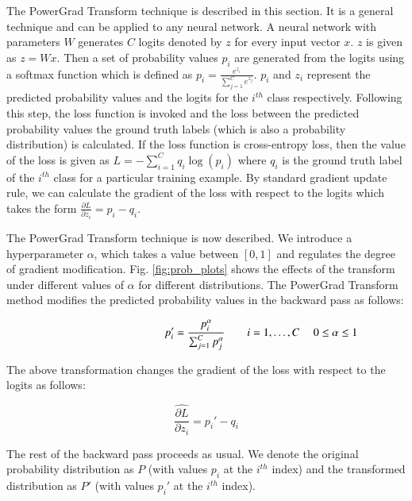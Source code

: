 \documentclass[times,sort&compress]{elsarticle}
\begin{document}
The PowerGrad Transform technique is described in this section. It is a general
technique and can be applied to any neural network. A neural network with parameters $W$
generates $C$ logits denoted by $z$ for every input vector $x$. $z$ is given as $z=Wx$.
Then a set of probability values $p_i$ are generated from the logits using a softmax
function which is defined as $p_i=\frac{e^{z_i}}{\sum _{j=1}^C e^{z_j}}$. $p_i$ and
$z_i$ represent the predicted probability values and the logits for the $i^{th}$ class
respectively. Following this step, the loss function is invoked and the loss between the
predicted probability values the ground truth labels (which is also a probability
distribution) is calculated. If the loss function is cross-entropy loss, then the value
of the loss is given as $L=-\sum _{i=1}^C q_i \log \left(p_i\right)$ where
$q_i$ is the ground truth label of the $i^{th}$ class for a particular training example.
By standard gradient update rule, we can calculate the gradient of the loss with respect
to the logits which takes the form $\frac{\partial L}{\partial z_i}=p_i-q_i$.

The PowerGrad Transform technique is now described. We introduce a hyperparameter
$\alpha$, which takes a value between $[0, 1]$ and regulates the degree of gradient
modification. Fig. \ref{fig:prob_plots} shows the effects of the transform under
different values of $\alpha$ for different distributions. The PowerGrad Transform method
modifies the predicted probability values in the backward pass as follows:

\begin{equation} \hspace*{3.5cm} p_i'=\frac{p_i^{\alpha }}{\sum _{j=1}^C
p_j^\alpha} \ \ \ \ \ \ \ \ i=1,\dots,C\ \ \ \ \ 0 \leq \alpha\leq 1
\label{transformed_probabilities} \end{equation}

The above transformation changes the gradient of the loss with respect to the logits as
follows:

\begin{equation} \widehat{\frac{\partial L}{\partial z_i}}=p_i'-q_i
\label{PGT_logit_derivative}
\end{equation}

The rest of the backward pass proceeds as usual. We denote the original probability
distribution as $P$ (with values $p_i$ at the $i^{th}$ index) and the transformed
distribution as $P'$ (with values $p_i'$ at the $i^{th}$ index).
\end{document}
